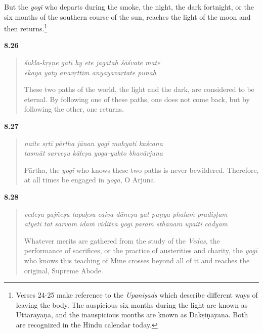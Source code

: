 {But the \textit{yogī} who departs during the smoke, the night, the dark fortnight, or the six months of the southern course of the sun, reaches the light of the moon and then returns.\footnote{Verses 24-25 make reference to the \textit{Upaniṣads} which describe different ways of leaving the body. The auspicious six months during the light are known as Uttarāyaṇa, and the inauspicious months are known as Dakṣiṇāyana. Both are recognized in the Hindu calendar today.}}


\par\noindent\textbf{8.26}\par
\begin{verse}
\textit{śukla-kṛṣṇe gatī hy ete jagataḥ śāśvate mate} \\
\textit{ekayā yāty anāvṛttim anyayāvartate punaḥ}

\noindent These two paths of the world, the light and the dark, are considered to be eternal. By following one of these paths, one does not come back, but by following the other, one returns.
\end{verse}
\par



\par\noindent\textbf{8.27}\par
\begin{verse}
\textit{naite sṛtī pārtha jānan yogī muhyati kaścana} \\
\textit{tasmāt sarveṣu kāleṣu yoga-yukto bhavārjuna}

\noindent Pārtha, the \textit{yogī} who knows these two paths is never bewildered. Therefore, at all times be engaged in \textit{yoga}, O Arjuna.
\end{verse}
\par



\par\noindent\textbf{8.28}\par
\begin{verse}
\textit{vedeṣu yajñeṣu tapaḥsu caiva dāneṣu yat puṇya-phalaṁ pradiṣṭam} \\
\textit{atyeti tat sarvam idaṁ viditvā yogī paraṁ sthānam upaiti cādyam}

\noindent Whatever merits are gathered from the study of the \textit{Vedas}, the performance of sacrifices, or the practice of austerities and charity, the \textit{yogī} who knows this teaching of Mine crosses beyond all of it and reaches the original, Supreme Abode.
\end{verse}
\par


